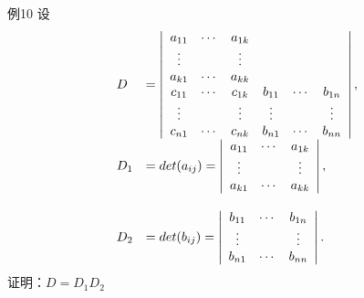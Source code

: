 \begin{frame}
  \begin{small}
    \begin{block}{例10}
      设
      $$
      \begin{array}{ll}
        D &= \left|
        \begin{array}{cccccc}
          a_{11} & \cdots & a_{1k} &    &    &   \\
          \vdots    &     &  \vdots  &    &    &   \\
          a_{k1} & \cdots & a_{kk} &    &    &   \\
          c_{11} & \cdots & c_{1k} & b_{11}&  \cdots & b_{1n}   \\
          \vdots    &     & \vdots   & \vdots  &    & \vdots \\
          c_{n1} & \cdots & c_{nk} & b_{n1}&  \cdots & b_{nn}
        \end{array}
        \right|, \\[1.0cm]
        D_1 &= det(a_{ij}) = \left|
        \begin{array}{ccc}
          a_{11} & \cdots & a_{1k} \\
          \vdots    &     &  \vdots  \\
          a_{k1} & \cdots & a_{kk} \\
        \end{array}
        \right|, \\[1.0cm]
        D_2 & = det(b_{ij}) = \left|
        \begin{array}{ccc}
          b_{11} & \cdots & b_{1n} \\
          \vdots    &     &  \vdots  \\
          b_{n1} & \cdots & b_{nn} \\
        \end{array}
        \right|.
      \end{array}
      $$
     证明：$D=D_1D_2$
    \end{block}
  \end{small}
\end{frame}

